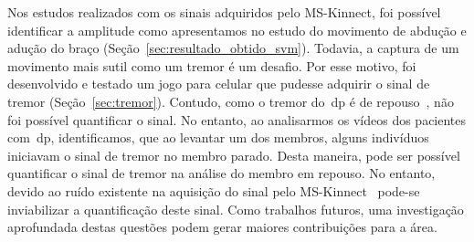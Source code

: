 Nos estudos realizados com os sinais adquiridos pelo MS-Kinnect, foi possível identificar a amplitude como apresentamos no estudo do movimento de abdução e adução do braço (Seção~\ref{sec:resultado_obtido_svm}). Todavia, a captura de um movimento mais sutil como um tremor é um desafio. Por esse motivo, foi desenvolvido e testado um jogo para celular que pudesse adquirir o sinal de tremor (Seção~\ref{sec:tremor}). Contudo, como o tremor do~\ac{dp} é de repouso~\cite{protpar010}, não foi possível quantificar o sinal. No entanto, ao analisarmos os vídeos dos pacientes com~\ac{dp}, identificamos, que ao levantar um dos membros, alguns indivíduos iniciavam o sinal de tremor no membro parado. Desta maneira, pode ser possível quantificar o sinal de tremor na análise do membro em repouso. No entanto, devido ao ruído existente na aquisição do sinal pelo MS-Kinnect~\cite{kinnect2013} pode-se inviabilizar a quantificação deste sinal. Como trabalhos futuros, uma investigação aprofundada destas questões podem gerar maiores contribuições para a área.








